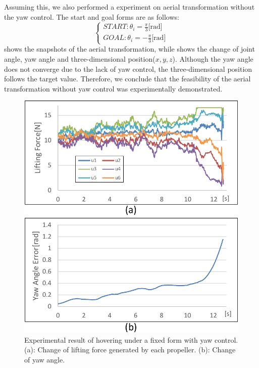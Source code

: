 \par
Assuming this, we also performed a experiment on aerial transformation without the yaw control. The start and goal forms are as follows:
\begin{equation}
  \begin{cases}
    START: \theta_i = \frac{\pi}{3}\text{[rad]}\\
    GOAL: \theta_i = -\frac{\pi}{3}\text{[rad]}
  \end{cases}
\end{equation} 
 shows the snapshots of the aerial transformation, while  shows the change of joint angle, yaw angle and three-dimensional position($x,y,z$). Although the yaw angle does not converge due to the lack of yaw control, the three-dimensional position follows the target value. Therefore, we conclude that the feasibility of the aerial transformation without yaw control was experimentally demonstrated.

\begin{figure}[th]
  \begin{center}
    \includegraphics[width=1.0\columnwidth]{figs/rotate_with_yaw.pdf}
  \end{center}
  \caption{Experimental result of hovering under a fixed form with yaw control. (a): Change of lifting force generated by each propeller. (b): Change of yaw angle. \label{figure:rotate_with_yaw}}
\end{figure}

